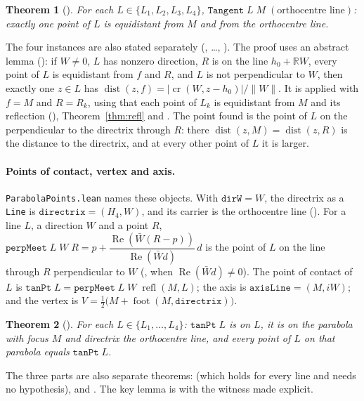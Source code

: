 \documentclass[11pt]{article}
\newtheorem{theorem}{Theorem}
\theoremstyle{definition}
\theoremstyle{remark}
\newcommand{\lean}[1]{\texttt{#1}}
\newcommand{\RR}{\mathbb{R}}
\begin{document}
\begin{theorem}[]\label{thm:tangent}
For each $L\in\{L_1,L_2,L_3,L_4\}$, $\lean{Tangent}\;L\;M\;(\text{orthocentre line})$: exactly one point
of $L$ is equidistant from $M$ and from the orthocentre line.
\end{theorem}
The four instances are also stated separately (, \dots,
). The proof uses an abstract lemma
(): if $W\neq0$, $L$ has nonzero direction, $R$ is on the line
$h_0+\RR W$, every point of $L$ is equidistant from $f$ and $R$, and $L$ is not perpendicular to $W$,
then exactly one $z\in L$ has $\operatorname{dist}(z,f)=|\operatorname{cr}(W,z-h_0)|/\|W\|$. It is
applied with $f=M$ and $R=R_k$, using that each point of $L_k$ is equidistant from $M$ and its
reflection (), Theorem~\ref{thm:refl} and
. The point found is the point of $L$ on the perpendicular to the
directrix through $R$: there $\operatorname{dist}(z,M)=\operatorname{dist}(z,R)$ is the distance to the
directrix, and at every other point of $L$ it is larger.

\paragraph{Points of contact, vertex and axis.} \lean{ParabolaPoints.lean} names these objects. With
$\lean{dirW}=W$, the directrix as a \lean{Line} is $\lean{directrix}=(H_4,W)$, and its carrier is the
orthocentre line (). For a line $L$, a direction $W$ and a point
$R$, $\lean{perpMeet}\;L\;W\;R=p+\dfrac{\operatorname{Re}(\bar W(R-p))}{\operatorname{Re}(\bar Wd)}\,d$
is the point of $L$ on the line through $R$ perpendicular to $W$ (,
when $\operatorname{Re}(\bar Wd)\neq0$). The point of contact of $L$ is
$\lean{tanPt}\;L=\lean{perpMeet}\;L\;W\;\operatorname{refl}(M,L)$; the axis is
$\lean{axisLine}=(M,iW)$; and the vertex is $V=\tfrac12\big(M+\operatorname{foot}(M,\lean{directrix})\big)$.

\begin{theorem}[]\label{thm:tanpt}
For each $L\in\{L_1,\dots,L_4\}$: $\lean{tanPt}\;L$ is on $L$, it is on the parabola with focus $M$ and
directrix the orthocentre line, and every point of $L$ on that parabola equals $\lean{tanPt}\;L$.
\end{theorem}
The three parts are also separate theorems:  (which holds for every line
and needs no hypothesis),  and . The
key lemma  is  with the witness
made explicit.
\end{document}
